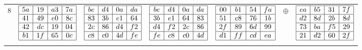\begin{longtable}{c c c c c c c}
  8 & 
  $\begin{array}{|c|c|c|c|}
    \hline
    5a & 19 & a3 & 7a \\ \hline
    41 & 49 & e0 & 8c \\ \hline
    42 & dc & 19 & 04 \\ \hline
    b1 & 1f & 65 & 0c \\ \hline
  \end{array}$ &
  $\begin{array}{|c|c|c|c|}
    \hline
    be & d4 & 0a & da \\ \hline
    83 & 3b & e1 & 64 \\ \hline
    2c & 86 & d4 & f2 \\ \hline
    c8 & c0 & 4d & fe \\ \hline
  \end{array}$ &
  $\begin{array}{|c|c|c|c|}
    \hline
    be & d4 & 0a & da \\ \hline
    3b & e1 & 64 & 83 \\ \hline
    d4 & f2 & 2c & 86 \\ \hline
    fe & c8 & c0 & 4d \\ \hline
  \end{array}$ &
  $\begin{array}{|c|c|c|c|}
    \hline
    00 & b1 & 54 & fa \\ \hline
    51 & c8 & 76 & 1b \\ \hline
    2f & 89 & 6d & 99 \\ \hline
    d1 & ff & cd & ea \\ \hline
  \end{array}$ &
  $\oplus$ &
  $\begin{array}{|c|c|c|c|}
    \hline
    ea & b5 & 31 & 7f \\ \hline
    d2 & 8d & 2b & 8d \\ \hline
    73 & ba & f5 & 29 \\ \hline
    21 & d2 & 60 & 2f \\ \hline
  \end{array}$ \\ \\
  

\end{longtable}
